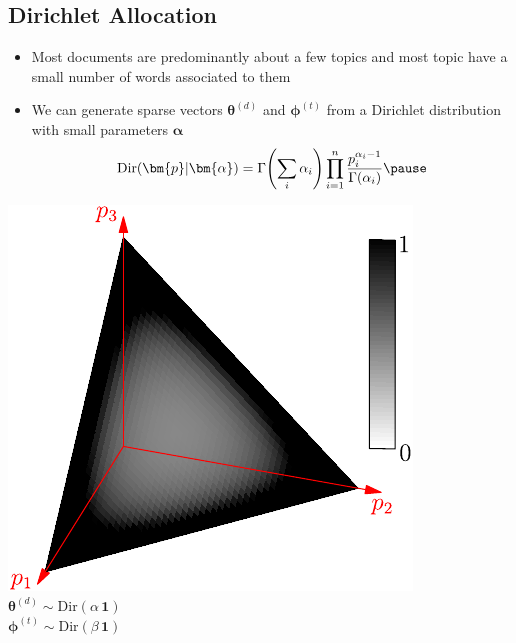 \begin{slide}
\section[-2]{Dirichlet Allocation}

\begin{minipage}{0.5\linewidth}
  \begin{PauseHighLight}
  \begin{itemize}
  \item Most documents are predominantly about a few topics and most
    topic have a small number of words associated to them\pause
  \item We can generate sparse vectors $\bm{\theta}^{(d)}$ and
    $\bm{\phi}^{(t)}$ from a Dirichlet distribution with small parameters
    $\bm{\alpha}$ 
    \begin{align*}
      \mathrm{Dir}(\bm{p}|\bm{\alpha}) = \Gamma\!\left(\sum_i
      \alpha_i\right) \prod_{i=1}^n
      \frac{p_i^{\alpha_i-1}}{\Gamma(\alpha_i)}\pause
    \end{align*}
    \end{itemize}
\end{PauseHighLight}
\end{minipage}\hfil
\begin{minipage}{0.4\linewidth}
  \begin{center}
    \includegraphics[width=0.95\linewidth]{dirichletSparse}\\
    $\bm{\theta}^{(d)} \sim \mathrm{Dir}(\alpha\,\bm{1})$\\
    $\bm{\phi}^{(t)}\sim \mathrm{Dir}(\beta\,\bm{1})$\pause
  \end{center}
\end{minipage}


\end{slide}

